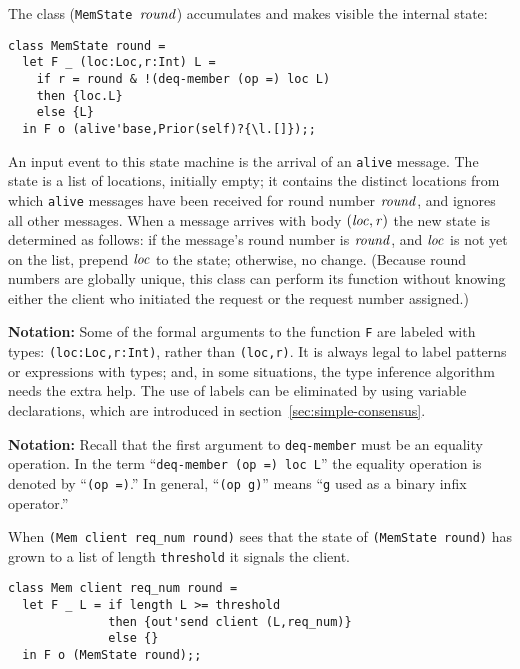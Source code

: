 \documentclass[final]{article}
\begin{document}
The class (\lstinline{MemState}~$\mathit{round}$) accumulates and makes visible
the internal state:
\begin{emlcode}
\begin{lstlisting}
class MemState round =
  let F _ (loc:Loc,r:Int) L =
    if r = round & !(deq-member (op =) loc L)
    then {loc.L}
    else {L}
  in F o (alive'base,Prior(self)?{\l.[]});;
\end{lstlisting}
\end{emlcode}
An input event to this state machine is the arrival of an
\lstinline{alive} message.  The state is a list of locations,
initially empty; it contains the distinct locations from which
\lstinline{alive} messages have been received for round number
$\mathit{round}$, and ignores all other messages.  When a message
arrives with body $(\mathit{loc},\mathit{r})$ the new state is
determined as follows: if the message's round number is
$\mathit{round}$, and $\mathit{loc}$ is not yet on the list, prepend
$\mathit{loc}$ to the state; otherwise, no change.  (Because round
numbers are globally unique, this class can perform its function
without knowing either the client who initiated the request or the
request number assigned.)

{\bf Notation:} Some of the formal arguments to the function
\lstinline{F} are labeled with types: \lstinline{(loc:Loc,r:Int)},
rather than \lstinline{(loc,r)}.  It is always legal to label patterns
or expressions with types; and, in some situations, the type inference
algorithm needs the extra help.  The use of labels can be eliminated
by using variable declarations, which are introduced in
section~\ref{sec:simple-consensus}.

{\bf Notation:} Recall that the first argument to
\lstinline{deq-member} must be an equality operation.  In the term
``\lstinline{deq-member (op =) loc L}'' the equality operation is
denoted by ``\lstinline{(op =)}.''  In general, ``\lstinline{(op g)}''
means ``\lstinline{g} used as a binary infix operator.''

When \lstinline{(Mem client req_num round)} sees that the
state of \lstinline{(MemState round)} has grown to a list of length
\lstinline{threshold} it signals the client.
\begin{emlcode}
\begin{lstlisting}
class Mem client req_num round =
  let F _ L = if length L >= threshold
              then {out'send client (L,req_num)}
              else {}
  in F o (MemState round);;
\end{lstlisting}
\end{emlcode}
\end{document}
